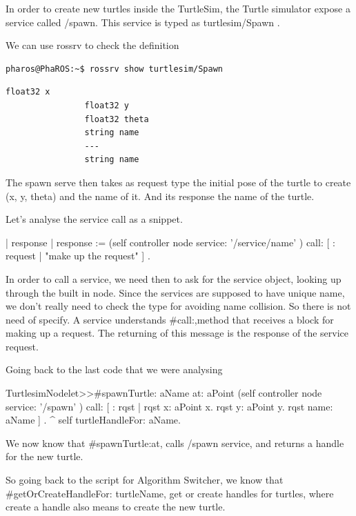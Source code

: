\documentclass[a4paper,10pt,twoside]{book}
\begin{document}
			In order to create new turtles inside the TurtleSim, the Turtle simulator expose a service called /spawn. This service is typed as turtlesim/Spawn .
			
			We can use rossrv to check the definition
			\begin{lstlisting}[language=bash,title={ Browsing service types }]
				pharos@PhaROS:~$ rossrv show turtlesim/Spawn
			\end{lstlisting}
			
			
			 \begin{lstlisting}[language=bash,title={turtlesim/Spawn definition }]
				float32 x
				float32 y
				float32 theta
				string name
				---
				string name
			\end{lstlisting}
			
			
			The spawn serve then takes as request type the initial pose of the turtle to create (x, y, theta) and the name of it. And its response the name of the turtle. 
			
			Let's analyse the service call as a snippet. 
			
			
			\begin{code}
			| response |
			response := (self controller node service: '/service/name' ) call: [ : request | 
				"make up the request"
			] .
			\end{code}
			
			In order to call a service, we need then to ask for the service object, looking up through the built in node. Since the services are supposed to have unique name, we don't really need to check the type for avoiding name collision. So there is not need of specify. A service understands \#call:,method that receives a block for making up a request. The returning of this message is the response of the service request. 
			
			
			Going back to the last code that we were analysing
			
			\begin{code}
TurtlesimNodelet>>#spawnTurtle: aName at: aPoint
	(self controller node service: '/spawn' ) call: [ : rqst | 
		rqst x: aPoint x. 
		rqst y: aPoint y. 
		rqst name: aName 
	] .
	^ self turtleHandleFor: aName.
			\end{code}
			
			We now know that \#spawnTurtle:at, calls /spawn service, and returns a handle for the new turtle.
			
			
			So going back to the script for Algorithm Switcher, we know that \#getOrCreateHandleFor: turtleName, get or create handles for turtles, where create a handle also means to create the new turtle. 
			
\end{document}
